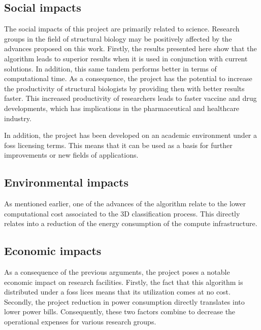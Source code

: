 \documentclass[../main.tex]{subfiles}
\begin{document}
\subsection{Social impacts}
The social impacts of this project are primarily related to science. Research groups in the field of structural biology may be positively affected by the advances proposed on this work. Firstly, the results presented here show that the algorithm leads to superior results when it is used in conjunction with current solutions. In addition, this same tandem performs better in terms of computational time. As a consequence, the project has the potential to increase the productivity of structural biologists by providing then with better results faster. This increased productivity of researchers leads to faster vaccine and drug developments, which has implications in the pharmaceutical and healthcare industry.

In addition, the project has been developed on an academic environment under a \gls{foss} licensing terms. This means that it can be used as a basis for further improvements or new fields of applications.   

\subsection{Environmental impacts}
As mentioned earlier, one of the advances of the algorithm relate to the lower computational cost associated to the 3D classification process. This directly relates into a reduction of the energy consumption of the compute infrastructure.

\subsection{Economic impacts}
As a consequence of the previous arguments, the project poses a notable economic impact on research facilities. Firstly, the fact that this algorithm is distributed under a \gls{foss} lices means that its utilization comes at no cost. Secondly, the project reduction in power consumption directly translates into lower power bills. Consequently, these two factors combine to decrease the operational expenses for various research groups.
\end{document}
